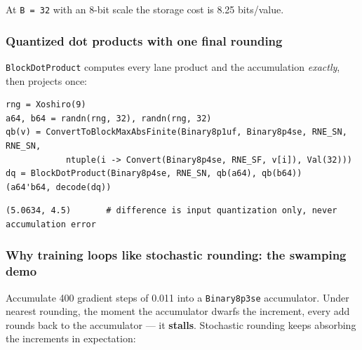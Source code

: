 At \texttt{B = 32} with an 8-bit scale the storage cost is 8.25 bits/value.



\subsubsection{Quantized dot products with one final rounding}



\label{1256464788428311555}{}


\texttt{BlockDotProduct} computes every lane product and the accumulation \emph{exactly}, then projects once:




\nopagebreak[4]
\begin{minipage}{\linewidth}
\begin{verbatim}
rng = Xoshiro(9)
a64, b64 = randn(rng, 32), randn(rng, 32)
qb(v) = ConvertToBlockMaxAbsFinite(Binary8p1uf, Binary8p4se, RNE_SN, RNE_SN,
            ntuple(i -> Convert(Binary8p4se, RNE_SF, v[i]), Val(32)))
dq = BlockDotProduct(Binary8p4se, RNE_SN, qb(a64), qb(b64))
(a64'b64, decode(dq))
\end{verbatim}




\begin{verbatim}
(5.0634, 4.5)       # difference is input quantization only, never accumulation error
\end{verbatim}
\end{minipage}




\subsubsection{Why training loops like stochastic rounding: the swamping demo}



\label{3016318026063494718}{}


Accumulate 400 gradient steps of 0.011 into a \texttt{Binary8p3se} accumulator. Under nearest rounding, the moment the accumulator dwarfs the increment, every add rounds back to the accumulator — it \textbf{stalls}. Stochastic rounding keeps absorbing the increments in expectation:




